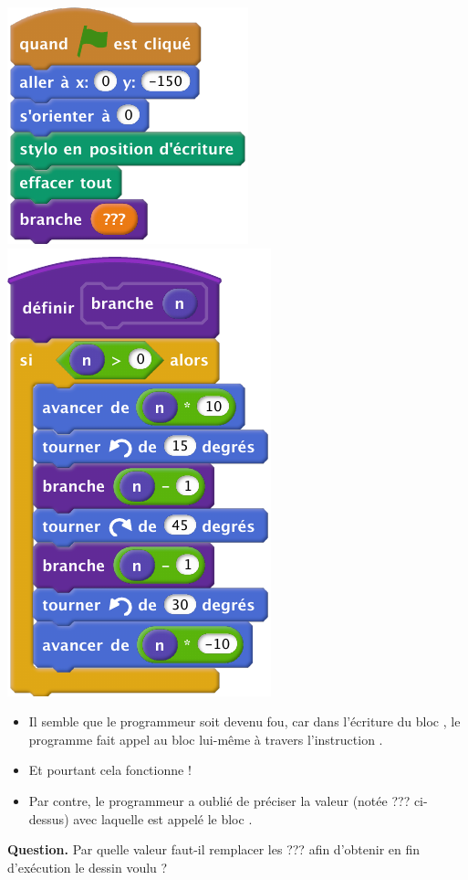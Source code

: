 \documentclass[class=report,crop=false, 12pt]{standalone}
\begin{document}
\begin{enigme}
\begin{center}
  \includegraphics[scale=\scalebloc,scale=0.8]{bloc-11-eg3a}
  \includegraphics[scale=\scalebloc,scale=0.8]{bloc-11-eg3b}
\end{center} 
\begin{itemize}
  \item Il semble que le programmeur soit devenu fou, car dans l'écriture du bloc , le programme fait appel
au bloc  lui-même à travers l'instruction .

  \item Et pourtant cela fonctionne !
  
   \item Par contre, le programmeur a oublié de préciser la valeur (notée \og{}???\fg{} ci-dessus) avec laquelle est appelé le bloc  .
\end{itemize}


\bigskip

\textbf{Question.} Par quelle valeur faut-il remplacer les \og{}???\fg{} afin d'obtenir en fin d’exécution le dessin voulu ?



\end{enigme}
\end{document}
